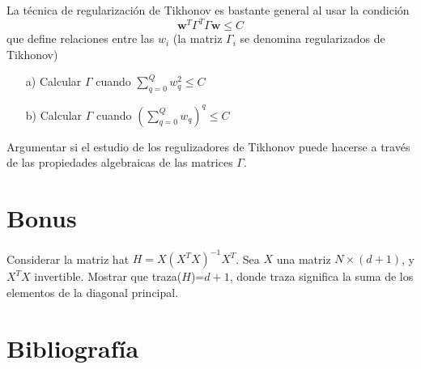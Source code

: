\documentclass[12pt]{article}
\theoremstyle{definition}
\begin{document}
\begin{pregunta}
La técnica de regularización de Tikhonov es bastante general al usar la condición
\[		\mathbf{w}^T\Gamma^T\Gamma\mathbf{w} \leq C		\]
que define relaciones entre las $w_i$ (la matriz $\Gamma_i$ se denomina regularizados de Tikhonov)
\begin{enumerate}
\item[a)] Calcular $\Gamma$ cuando $\sum_{q=0}^Qw_q^2 \leq C$
\item[b)] Calcular $\Gamma$ cuando $(\sum_{q=0}^Qw_q)^q \leq C$
\end{enumerate}
Argumentar si el estudio de los regulizadores de Tikhonov puede hacerse a través de las propiedades algebraicas de las matrices $\Gamma$.\\


\end{pregunta}

\section{Bonus}
\begin{pregunta}
Considerar la matriz hat $H=X(X^TX)^{-1}X^T$. Sea $X$ una matriz $N \times (d+1)$, y $X^TX$ invertible. Mostrar que traza($H$)=$d+1$, donde traza significa la suma de los elementos de la diagonal principal.

\end{pregunta}

\section{Bibliografía}
\end{document}
